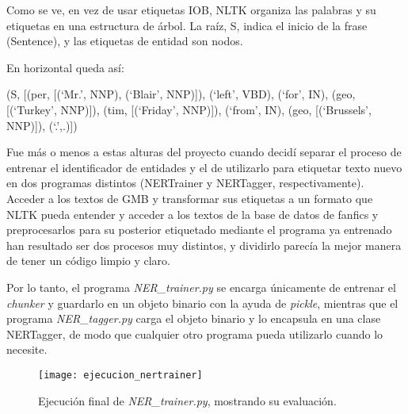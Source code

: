 \documentclass{pre-tfg}
\begin{document}
Como se ve, en vez de usar etiquetas IOB, NLTK organiza las palabras y su etiquetas en una estructura de árbol. La raíz, S, indica el inicio de la frase (Sentence), y las etiquetas de entidad son nodos.

En horizontal queda así:

(S, [(per, [(‘Mr.’, NNP), (‘Blair’, NNP)]), (‘left’, VBD), (‘for’, IN), (geo, [(‘Turkey’, NNP)]), (tim, [(‘Friday’, NNP)]), (‘from’, IN), (geo, [(‘Brussels’, NNP)]), (‘.’,.)])

Fue más o menos a estas alturas del proyecto cuando decidí separar el proceso de entrenar el identificador de entidades y el de utilizarlo para etiquetar texto nuevo en dos programas distintos (NERTrainer y NERTagger, respectivamente). Acceder a los textos de GMB y transformar sus etiquetas a un formato que NLTK pueda entender y acceder a los textos de la base de datos de fanfics y preprocesarlos para su posterior etiquetado mediante el programa ya entrenado han resultado ser dos procesos muy distintos, y dividirlo parecía la mejor manera de tener un código limpio y claro.

Por lo tanto, el programa \textit{NER\_trainer.py} se encarga únicamente de entrenar el \textit{chunker} y guardarlo en un objeto binario con la ayuda de \textit{pickle}, mientras que el programa \textit{NER\_tagger.py} carga el objeto binario y lo encapsula en una clase NERTagger, de modo que cualquier otro programa pueda utilizarlo cuando lo necesite.

\begin{figure}[!h]
	\centering
	\texttt{[image: ejecucion\_nertrainer]}
	\caption{Ejecución final de \textit{NER\_trainer.py}, mostrando su evaluación.}
	\label{fig:ner_evaluation}
\end{figure}
\end{document}
